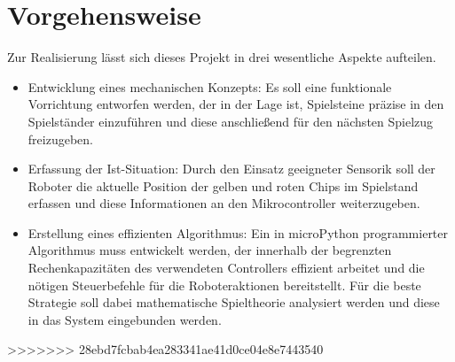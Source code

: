 \section{Vorgehensweise}
Zur Realisierung lässt sich dieses Projekt in drei wesentliche Aspekte aufteilen.
\begin{itemize}
\item Entwicklung eines mechanischen Konzepts: Es soll eine funktionale Vorrichtung entworfen werden, der in der Lage ist, Spielsteine präzise in den Spielständer einzuführen und diese anschließend für den nächsten Spielzug freizugeben.
\item Erfassung der Ist-Situation: Durch den Einsatz geeigneter Sensorik soll der Roboter die aktuelle Position der gelben und roten Chips im Spielstand erfassen und diese Informationen an den Mikrocontroller weiterzugeben.
\item Erstellung eines effizienten Algorithmus: Ein in microPython programmierter Algorithmus muss entwickelt werden, der innerhalb der begrenzten Rechenkapazitäten des verwendeten Controllers effizient arbeitet und die nötigen Steuerbefehle für die Roboteraktionen bereitstellt. Für die beste Strategie soll dabei mathematische Spieltheorie analysiert werden und diese in das System eingebunden werden.
\end{itemize}

>>>>>>> 28ebd7fcbab4ea283341ae41d0ce04e8e7443540
